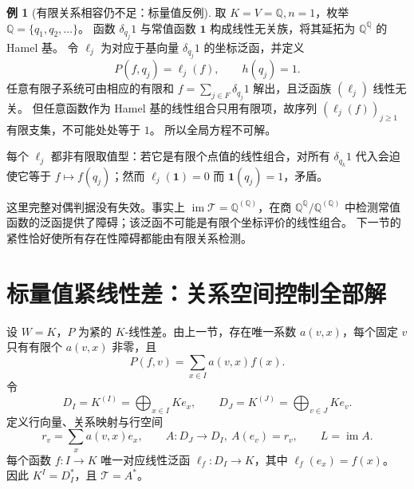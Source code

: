 \documentclass[UTF8,11pt,a4paper]{ctexart}
\theoremstyle{definition}
\newtheorem{example}[theorem]{例}
\newcommand{\Q}{\mathbb Q}
\newcommand{\im}{\operatorname{im}}
\newcommand{\T}{\mathcal T}
\begin{document}
\begin{example}[有限关系相容仍不足：标量值反例]\label{ex:noncompact}
取 $K=V=\Q,n=1$，枚举 $\Q=\{q_1,q_2,\ldots\}$。
函数 $\delta_{q_j}1$ 与常值函数 $\mathbf1$ 构成线性无关族，将其延拓为 $\Q^{\Q}$ 的 Hamel 基。
令 $\ell_j$ 为对应于基向量 $\delta_{q_j}1$ 的坐标泛函，并定义
\[
 P(f,q_j)=\ell_j(f),\qquad h(q_j)=1.
\]
任意有限子系统可由相应的有限和 $f=\sum_{j\in F}\delta_{q_j}1$ 解出，且泛函族 $(\ell_j)$ 线性无关。
但任意函数作为 Hamel 基的线性组合只用有限项，故序列 $(\ell_j(f))_{j\ge1}$ 有限支集，不可能处处等于 $1$。
所以全局方程不可解。

每个 $\ell_j$ 都非有限取值型：若它是有限个点值的线性组合，对所有 $\delta_{q_k}1$ 代入会迫使它等于 $f\mapsto f(q_j)$；然而 $\ell_j(\mathbf1)=0$ 而 $\mathbf1(q_j)=1$，矛盾。
\end{example}
这里完整对偶判据没有失效。事实上 $\im\T=\Q^{(\Q)}$，在商 $\Q^{\Q}/\Q^{(\Q)}$ 中检测常值函数的泛函提供了障碍；该泛函不可能是有限个坐标评价的线性组合。
下一节的紧性恰好使所有存在性障碍都能由有限关系检测。

\section{标量值紧线性差：关系空间控制全部解}\label{sec:scalar}
设 $W=K$，$P$ 为紧的 $K$-线性差。由上一节，存在唯一系数 $a(v,x)$，每个固定 $v$ 只有有限个 $a(v,x)$ 非零，且
\begin{equation}\label{eq:rowfinite}
 P(f,v)=\sum_{x\in I}a(v,x)f(x).
\end{equation}
令
\[
 D_I=K^{(I)}=\bigoplus_{x\in I}Ke_x,\qquad
 D_J=K^{(J)}=\bigoplus_{v\in J}Ke_v.
\]
定义行向量、关系映射与行空间
\begin{equation}\label{eq:A}
 r_v=\sum_xa(v,x)e_x,\qquad
 A:D_J\to D_I,\ A(e_v)=r_v,\qquad L=\im A.
\end{equation}
每个函数 $f:I\to K$ 唯一对应线性泛函
$\ell_f:D_I\to K$，其中 $\ell_f(e_x)=f(x)$。
因此 $K^I=D_I^*$，且 $\T=A^*$。
\end{document}
